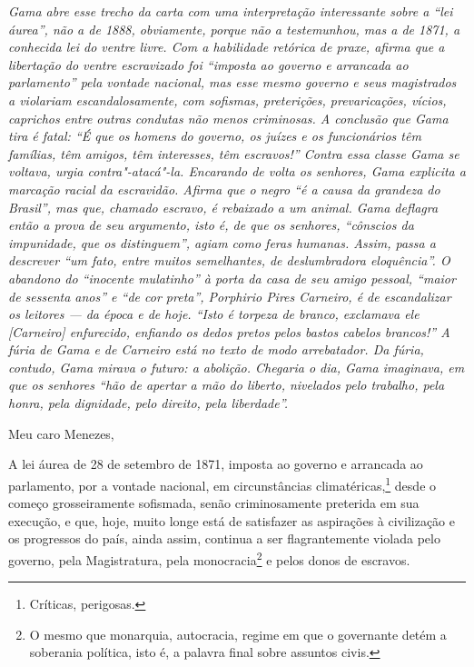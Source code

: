 \begin{flushleft}
{\footnotesize\itshape
Gama abre esse trecho da carta com uma interpretação interessante
sobre a ``lei áurea'', não a de 1888, obviamente, porque não a
testemunhou, mas a de 1871, a conhecida lei do ventre livre. Com a
habilidade retórica de praxe, afirma que a libertação do ventre
escravizado foi ``imposta ao governo e arrancada ao parlamento'' pela
vontade nacional, mas esse mesmo governo e seus magistrados a violariam
escandalosamente, com sofismas, preterições, prevaricações, vícios,
caprichos entre outras condutas não menos criminosas. A conclusão que
Gama tira é fatal: ``É que os homens do governo, os juízes e os
funcionários têm famílias, têm amigos, têm interesses, têm escravos!''
Contra essa classe Gama se
voltava, urgia contra"-atacá"-la. Encarando de volta os
senhores, Gama explicita a marcação racial da escravidão. Afirma que o
negro ``é a causa da grandeza do Brasil'', mas que, chamado escravo, 
é rebaixado a um animal. Gama deflagra então a prova de seu
argumento, isto é, de que os senhores, ``cônscios da impunidade, que os
distinguem'', agiam como feras humanas. Assim, passa a descrever ``um
fato, entre muitos semelhantes, de deslumbradora eloquência''. O abandono
do ``inocente mulatinho'' à porta da casa de seu amigo pessoal, ``maior de
sessenta anos'' e ``de cor preta'', Porphirio Pires Carneiro, é de
escandalizar os leitores --- da época e de hoje. ``Isto é torpeza de
branco, exclamava ele {[}Carneiro{]} enfurecido, enfiando os dedos
pretos pelos bastos cabelos brancos!'' A fúria de Gama e de Carneiro
está no texto de modo arrebatador. Da fúria, contudo, Gama mirava o
futuro: a abolição. Chegaria o dia, Gama imaginava, em que os senhores
``hão de apertar a mão do liberto, nivelados pelo trabalho, pela honra,
pela dignidade, pelo direito, pela liberdade''. }
\end{flushleft}

\noindent{}Meu caro Menezes,\smallskip

A lei áurea de 28 de setembro de 1871, imposta ao governo e arrancada ao
parlamento, por a vontade nacional, em circunstâncias
climatéricas,\footnote{Críticas, perigosas.} desde o começo
grosseiramente sofismada, senão criminosamente preterida em sua
execução, e que, hoje, muito longe está de satisfazer as aspirações à
civilização e os progressos do país, ainda assim, continua a ser
flagrantemente violada pelo governo, pela Magistratura, pela
monocracia\footnote{O mesmo que monarquia, autocracia, regime em que o
  governante detém a soberania política, isto é, a palavra final sobre
  assuntos civis.} e pelos donos de escravos.

